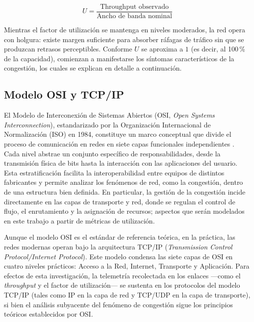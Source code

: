 \documentclass[12pt]{report}
\begin{document}
\begin{equation}
    U = \frac{\text{Throughput observado}}{\text{Ancho de banda nominal}}
    \label{eq:utilizacion}
\end{equation}

Mientras el factor de utilización se mantenga en niveles moderados, la red opera con holgura: existe margen suficiente para absorber ráfagas de tráfico sin que se produzcan retrasos perceptibles. Conforme $U$ se aproxima a $1$ (es decir, al 100\,\% de la capacidad), comienzan a manifestarse los síntomas característicos de la congestión, 
los cuales se explican en detalle a continuación.

\subsection{Modelo OSI y TCP/IP}
\label{sec:osi}

El Modelo de Interconexión de Sistemas Abiertos (OSI, \textit{Open Systems Interconnection}), estandarizado por la Organización Internacional de Normalización (ISO) en 1984, constituye un marco conceptual que divide el proceso de comunicación en redes en siete capas funcionales independientes \cite{tanenbaum2011}. Cada nivel abstrae un 
conjunto específico de responsabilidades, desde la transmisión física de bits hasta la interacción con las aplicaciones del usuario. Esta estratificación facilita la interoperabilidad entre equipos de distintos fabricantes y permite analizar los fenómenos de red, como la congestión, dentro de una estructura bien definida. En particular, 
la gestión de la congestión incide directamente en las capas de transporte y red, donde se regulan el control de flujo, el enrutamiento y la asignación de recursos; aspectos que serán modelados en este trabajo a partir de métricas de utilización.

Aunque el modelo OSI es el estándar de referencia teórica, en la práctica, las redes modernas operan bajo la arquitectura TCP/IP (\textit{Transmission Control Protocol/Internet Protocol}). Este modelo condensa las siete capas de OSI en cuatro niveles prácticos: Acceso a la Red, Internet, Transporte y Aplicación. Para efectos de esta investigación, 
la telemetría recolectada en los enlaces —como el \textit{throughput} y el factor de utilización— se sustenta en los protocolos del modelo TCP/IP (tales como IP en la capa de red y TCP/UDP en la capa de transporte), si bien el análisis subyacente del fenómeno de congestión sigue los principios teóricos establecidos por OSI.
\end{document}
